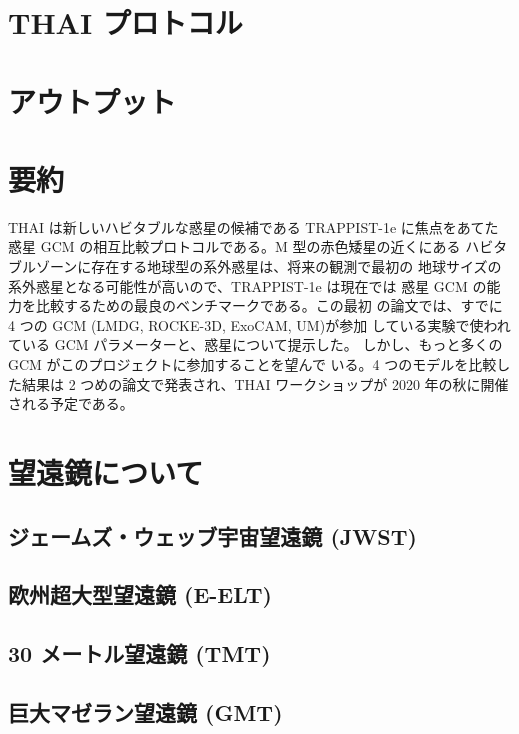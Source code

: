 \documentclass{dennou777}
\begin{document}
\section{THAI プロトコル}\label{thai}

\section{アウトプット}\label{outputs}

\section{要約}\label{summary}
THAI は新しいハビタブルな惑星の候補である TRAPPIST-1e に焦点をあてた
惑星 GCM の相互比較プロトコルである。M 型の赤色矮星の近くにある
ハビタブルゾーンに存在する地球型の系外惑星は、将来の観測で最初の
地球サイズの系外惑星となる可能性が高いので、TRAPPIST-1e は現在では
惑星 GCM の能力を比較するための最良のベンチマークである。この最初
の論文では、すでに 4 つの GCM (LMDG, ROCKE-3D, ExoCAM, UM)が参加
している実験で使われている GCM パラメーターと、惑星について提示した。
しかし、もっと多くの GCM がこのプロジェクトに参加することを望んで
いる。4 つのモデルを比較した結果は 2 つめの論文で発表され、THAI
ワークショップが 2020 年の秋に開催される予定である。

\appendix
{}
\section{望遠鏡について\label{telescope}}
\subsection{ジェームズ・ウェッブ宇宙望遠鏡 (JWST)}
\subsection{欧州超大型望遠鏡 (E-ELT)}
\subsection{30 メートル望遠鏡 (TMT)}
\subsection{巨大マゼラン望遠鏡 (GMT)}
\end{document}

